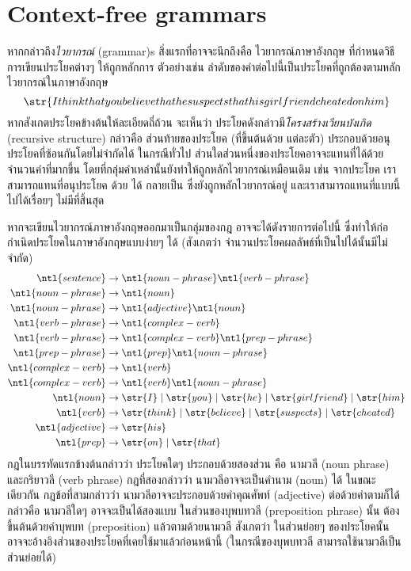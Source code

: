 \section{Context-free grammars}

หากกล่าวถึง\emph{ไวยากรณ์} (grammar)s สิ่งแรกที่อาจจะนึกถึงคือ ไวยากรณ์ภาษาอังกฤษ ที่กำหนดวิธีการเขียนประโยคต่างๆ ให้ถูกหลักการ \enskip ตัวอย่างเช่น ลำดับของคำต่อไปนี้เป็นประโยคที่ถูกต้องตามหลักไวยากรณ์ในภาษาอังกฤษ
\[
\str{I think that you believe that he suspects that his girlfriend cheated on him}
\]
หากสังเกตประโยคข้างต้นให้ละเอียดถี่ถ้วน จะเห็นว่า ประโยคดังกล่าวมี\emph{โครงสร้างเวียนบังเกิด} (recursive structure) กล่าวคือ ส่วนท้ายของประโยค (ที่ขึ้นต้นด้วย  แต่ละตัว) ประกอบด้วยอนุประโยคที่ซ้อนกันโดยไม่จำกัดได้ \enskip ในกรณีทั่วไป ส่วนใดส่วนหนึ่งของประโยคอาจจะแทนที่ได้ด้วยจำนวนคำที่มากขึ้น โดยที่กลุ่มคำเหล่านั้นยังทำให้ถูกหลักไวยากรณ์เหมือนเดิม เช่น จากประโยค  เราสามารถแทนที่อนุประโยค  ด้วย  ได้ กลายเป็น  ซึ่งยังถูกหลักไวยากรณ์อยู่ และเราสามารถแทนที่แบบนี้ไปได้เรื่อยๆ ไม่มีที่สิ้นสุด

หากจะเขียนไวยากรณ์ภาษาอังกฤษออกมาเป็นกลุ่มของกฎ อาจจะได้ดังรายการต่อไปนี้ ซึ่งทำให้ก่อกำเนิดประโยคในภาษาอังกฤษแบบง่ายๆ ได้ (สังเกตว่า จำนวนประโยคผลลัพธ์ที่เป็นไปได้นั้นมีไม่จำกัด)
\begin{align*}
\ntl{sentence}
 &\to \ntl{noun-phrase}\ntl{verb-phrase} \\
\ntl{noun-phrase}
 &\to \ntl{noun} \\
\ntl{noun-phrase}
 &\to \ntl{adjective}\ntl{noun} \\
\ntl{verb-phrase}
 &\to \ntl{complex-verb} \\
\ntl{verb-phrase}
 &\to \ntl{complex-verb}\ntl{prep-phrase} \\
\ntl{prep-phrase}
 &\to \ntl{prep}\ntl{noun-phrase} \\
\ntl{complex-verb}
 &\to \ntl{verb} \\
\ntl{complex-verb}
 &\to \ntl{verb}\ntl{noun-phrase} \\
\ntl{noun}
 &\to \str{I}\mid\str{you}\mid\str{he}\mid\str{girlfriend}\mid\str{him} \\
\ntl{verb}
 &\to \str{think}\mid\str{believe}\mid\str{suspects}\mid\str{cheated} \\
\ntl{adjective}
 &\to \str{his} \\
\ntl{prep}
 &\to \str{on}\mid\str{that}
\end{align*}
กฎในบรรทัดแรกข้างต้นกล่าวว่า ประโยคใดๆ ประกอบด้วยสองส่วน คือ นามวลี (noun phrase) และกริยาวลี (verb phrase) \enskip กฎที่สองกล่าวว่า นามวลีอาจจะเป็นคำนาม (noun) ได้ ในขณะเดียวกัน กฎข้อที่สามกล่าวว่า นามวลีอาจจะประกอบด้วยคำคุณศัพท์ (adjective) ต่อด้วยคำตามก็ได้ กล่าวคือ นามวลีใดๆ อาจจะเป็นได้สองแบบ \enskip ในส่วนของบุพบทวลี (preposition phrase) นั้น ต้องขึ้นต้นด้วยคำบุพบท (preposition) แล้วตามด้วยนามวลี \enskip สังเกตว่า ในส่วนย่อยๆ ของประโยคนั้น อาจจะอ้างอิงส่วนของประโยคที่เคยใช้มาแล้วก่อนหน้านี้ (ในกรณีของบุพบทวลี สามารถใช้นามวลีเป็นส่วนย่อยได้)

